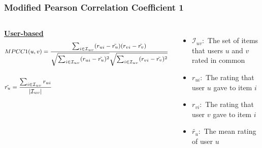 \begin{frame}
\begin{columns}
\begin{itemize}
        \end{itemize}
    \end{columns}
\end{frame}
\begin{frame}
    \frametitle{Modified Pearson Correlation Coefficient 1}
    \vspace{-0.8cm}
    \begin{columns}
        \hspace{-7mm}
        \centering
        \underline{\textbf{User-based}}
        \begin{equation*}
            \footnotesize
            \begin{split}
    &MPCC1(u,v) = \frac{\sum_{i \in \mathcal{I}_{uv}}(r_{ui}-\tilde{r_{u}})(r_{vi}-\tilde{r_{v}})}
                       {\sqrt{\sum_{i \in \mathcal{I}_{uv}}(r_{ui}-\tilde{r_{u}})^2}
                        \sqrt{\sum_{i \in \mathcal{I}_{uv}}(r_{vi}-\tilde{r_{v}})^2}} \\\\
      &\tilde{r_{u}} = \frac{\sum_{i \in \mathcal{I}_{uv}}r_{ui}}
                          {\mathopen|\mathcal{I}_{uv}\mathclose|}
            \end{split}
        \end{equation*}
        \tiny
        \begin{itemize}
            \item $\mathcal{I}_{uv}:$ The set of items that users $u$ and $v$ rated in common
            \item $r_{ui}:$ The rating that user $u$ gave to item $i$
            \item $r_{vi}:$ The rating that user $v$ gave to item $i$
            \item $\tilde{r_{u}}:$ The mean rating of user $u$


\end{itemize}
\end{columns}
\end{frame}

